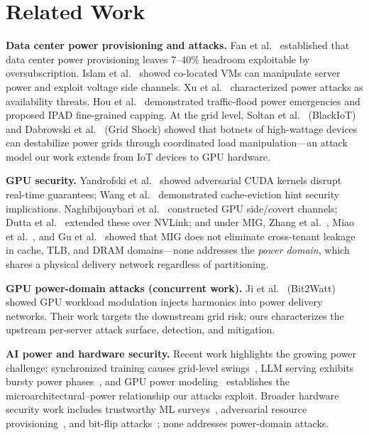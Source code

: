 \documentclass[letterpaper,twocolumn,10pt]{article}
\begin{document}
\section{Related Work}
\label{sec:related}

\textbf{Data center power provisioning and attacks.}
Fan et al.~\cite{fan2007} established that data center power
provisioning leaves 7--40\% headroom exploitable by oversubscription.
Islam et al.~\cite{islam2017,islam2018} showed co-located VMs can
manipulate server power and exploit voltage side channels.
Xu et al.~\cite{xu2014} characterized power attacks as availability
threats.  Hou et al.~\cite{hou2019,hou2022} demonstrated
traffic-flood power emergencies and proposed IPAD fine-grained
capping.  At the grid level, Soltan et al.~\cite{soltan2018}
(BlackIoT) and Dabrowski et al.~\cite{dabrowski2017} (Grid Shock)
showed that botnets of high-wattage devices can destabilize power
grids through coordinated load manipulation---an attack model our
work extends from IoT devices to GPU hardware.

\textbf{GPU security.}
Yandrofski et al.~\cite{yandrofski2022} showed adversarial CUDA
kernels disrupt real-time guarantees; Wang et al.~\cite{wang2025}
demonstrated cache-eviction hint security implications.
Naghibijouybari et
al.~\cite{naghibijouybari2017,naghibijouybari2018,naghibijouybari2019}
constructed GPU side/covert channels; Dutta et
al.~\cite{dutta2023} extended these over NVLink; and under MIG,
Zhang et al.~\cite{zhang2023tunnels}, Miao et
al.~\cite{miao2024}, and Gu et al.~\cite{gu2026} showed that
MIG does not eliminate cross-tenant leakage in cache, TLB, and
DRAM domains---none addresses the \emph{power domain}, which
shares a physical delivery network regardless of partitioning.

\textbf{GPU power-domain attacks (concurrent work).}
Ji et al.~\cite{ji2026} (Bit2Watt) showed GPU workload modulation
injects harmonics into power delivery networks.  Their work targets
the downstream grid risk; ours characterizes the upstream per-server
attack surface, detection, and mitigation.

\textbf{AI power and hardware security.}
Recent work highlights the growing power challenge:
synchronized training causes grid-level swings~\cite{choukse2025},
LLM serving exhibits bursty power phases~\cite{patel2024}, and
GPU power modeling~\cite{hong2010,leng2013,wattgpu2025} establishes
the microarchitectural--power relationship our attacks exploit.
Broader hardware security work includes trustworthy ML
surveys~\cite{islam2024}, adversarial resource
provisioning~\cite{nazari2023}, and bit-flip
attacks~\cite{rakin2019}; none addresses power-domain attacks.
\end{document}
